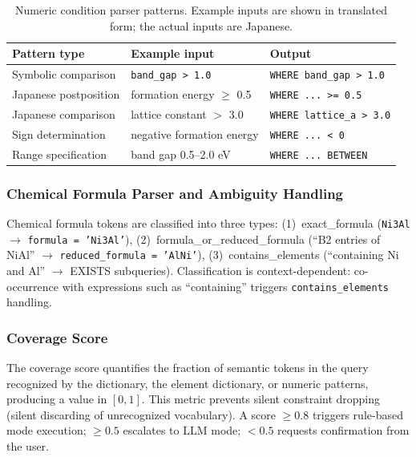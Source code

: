 \begin{table}[t]
  \centering
  \caption{Numeric condition parser patterns. Example inputs are shown in translated form; the actual inputs are Japanese.}
  \label{tab:numeric_patterns}
  \scriptsize
  \begin{tabular}{lll}
    \toprule
    Pattern type & Example input & Output \\
    \midrule
    Symbolic comparison & \texttt{band\_gap > 1.0} & \texttt{WHERE band\_gap > 1.0} \\
    Japanese postposition & formation energy $\geq$ 0.5 & \texttt{WHERE ... >= 0.5} \\
    Japanese comparison & lattice constant $>$ 3.0 & \texttt{WHERE lattice\_a > 3.0} \\
    Sign determination & negative formation energy & \texttt{WHERE ... < 0} \\
    Range specification & band gap 0.5--2.0 eV & \texttt{WHERE ... BETWEEN} \\
    \bottomrule
  \end{tabular}
\end{table}

\subsubsection{Chemical Formula Parser and Ambiguity Handling}

Chemical formula tokens are classified into three types:
(1)~exact\_formula (\texttt{Ni3Al} $\to$ \texttt{formula = 'Ni3Al'}),
(2)~formula\_or\_reduced\_formula (``B2 entries of NiAl'' $\to$ \texttt{reduced\_formula = 'AlNi'}),
(3)~contains\_elements (``containing Ni and Al'' $\to$ EXISTS subqueries).
Classification is context-dependent: co-occurrence with expressions such as ``containing'' triggers \texttt{contains\_elements} handling.

\subsubsection{Coverage Score}

The coverage score quantifies the fraction of semantic tokens in the query recognized by the dictionary, the element dictionary, or numeric patterns, producing a value in $[0, 1]$. This metric prevents silent constraint dropping (silent discarding of unrecognized vocabulary). A score $\geq 0.8$ triggers rule-based mode execution; $\geq 0.5$ escalates to LLM mode; $< 0.5$ requests confirmation from the user.

